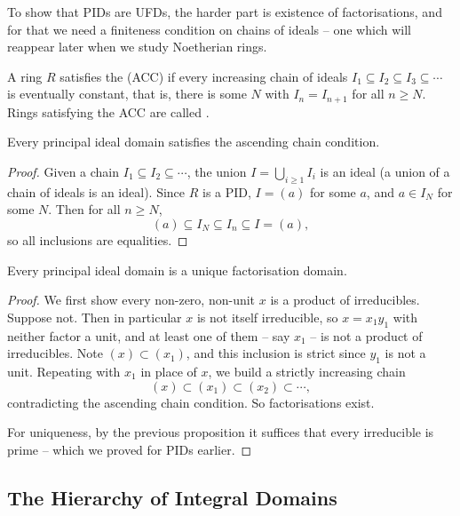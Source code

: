 To show that PIDs are UFDs, the harder part is existence of factorisations, and for that we need a finiteness condition on chains of ideals -- one which will reappear later when we study Noetherian rings.

\begin{definition}
	A ring $R$ satisfies the  (ACC) if every increasing chain of ideals $I_1 \subseteq I_2 \subseteq I_3 \subseteq \cdots$ is eventually constant, that is, there is some $N$ with $I_n = I_{n+1}$ for all $n \geq N$. Rings satisfying the ACC are called .
\end{definition}

\begin{lemma}
	Every principal ideal domain satisfies the ascending chain condition.
\end{lemma}
\begin{proof}
	Given a chain $I_1 \subseteq I_2 \subseteq \cdots$, the union $I = \bigcup_{i \geq 1} I_i$ is an ideal (a union of a chain of ideals is an ideal). Since $R$ is a PID, $I = (a)$ for some $a$, and $a \in I_N$ for some $N$. Then for all $n \geq N$,
	$$
	(a) \subseteq I_N \subseteq I_n \subseteq I = (a),
	$$
	so all inclusions are equalities.
\end{proof}

\begin{theorem}
	Every principal ideal domain is a unique factorisation domain.
\end{theorem}
\begin{proof}
	We first show every non-zero, non-unit $x$ is a product of irreducibles. Suppose not. Then in particular $x$ is not itself irreducible, so $x = x_1 y_1$ with neither factor a unit, and at least one of them -- say $x_1$ -- is not a product of irreducibles. Note $(x) \subset (x_1)$, and this inclusion is strict since $y_1$ is not a unit. Repeating with $x_1$ in place of $x$, we build a strictly increasing chain
	$$
	(x) \subset (x_1) \subset (x_2) \subset \cdots,
	$$
	contradicting the ascending chain condition. So factorisations exist.

	For uniqueness, by the previous proposition it suffices that every irreducible is prime -- which we proved for PIDs earlier.
\end{proof}

\subsection{The Hierarchy of Integral Domains}


